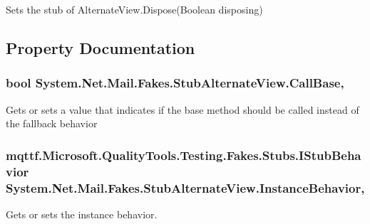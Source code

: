 Sets the stub of Alternate\-View.\-Dispose(\-Boolean disposing)



\subsection{Property Documentation}
\hypertarget{class_system_1_1_net_1_1_mail_1_1_fakes_1_1_stub_alternate_view_a6e6a40b99a92e14f5249aba6e24b0481}{
\subsubsection[{Call\-Base}]{\setlength{\rightskip}{0pt plus 5cm}bool System.\-Net.\-Mail.\-Fakes.\-Stub\-Alternate\-View.\-Call\-Base\hspace{0.3cm}{\ttfamily [get]}, {\ttfamily [set]}}}\label{class_system_1_1_net_1_1_mail_1_1_fakes_1_1_stub_alternate_view_a6e6a40b99a92e14f5249aba6e24b0481}


Gets or sets a value that indicates if the base method should be called instead of the fallback behavior

\hypertarget{class_system_1_1_net_1_1_mail_1_1_fakes_1_1_stub_alternate_view_a6ea70f9b8f7e189d93fb47fc54de9506}{
\subsubsection[{Instance\-Behavior}]{\setlength{\rightskip}{0pt plus 5cm}mqttf.\-Microsoft.\-Quality\-Tools.\-Testing.\-Fakes.\-Stubs.\-I\-Stub\-Behavior System.\-Net.\-Mail.\-Fakes.\-Stub\-Alternate\-View.\-Instance\-Behavior\hspace{0.3cm}{\ttfamily [get]}, {\ttfamily [set]}}}\label{class_system_1_1_net_1_1_mail_1_1_fakes_1_1_stub_alternate_view_a6ea70f9b8f7e189d93fb47fc54de9506}


Gets or sets the instance behavior.

